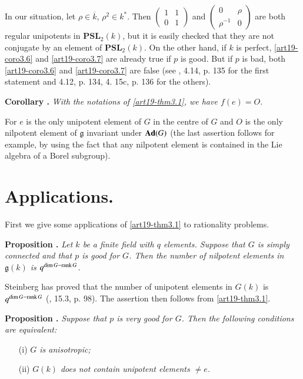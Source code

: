 In our situation, let $\rho\in \overline{k}$, $\rho^{2}\in k^{*}$. Then $\left(\begin{matrix} 1 & 1\\ 0 & 1\end{matrix}\right)$ and $\left(\begin{matrix} 0 & \rho\\ \rho^{-1} & 0\end{matrix}\right)$ are both regular unipotents in $\mathbf{PSL}_{2}(k)$, but it is easily checked that they are not conjugate by an element of $\mathbf{PSL}_{2}(k)$. On the other hand, if $k$ is perfect, \ref{art19-coro3.6} and \ref{art19-coro3.7} are already true if $p$ is good. But if $p$ is bad, both \ref{art19-coro3.6} and \ref{art19-coro3.7} are false (see \cite{art19-key14}, 4.14, p. 135 for the first statement and 4.12, p. 134, 4. 15c, p. 136 for the others).

\medskip
\noindent
{\bf Corollary .\label{art19-coro3.9}}
{\em With the notations of \ref{art19-thm3.1}, we have $f(e)=O$.}
\smallskip

For $e$ is the only unipotent element of $G$ in the centre of $G$ and $O$ is the only nilpotent element of $\mathfrak{g}$ invariant under $\mathbf{Ad}(G)$ (the last assertion follows for example, by using the fact that any nilpotent element is contained in the Lie algebra of a Borel subgroup).

\section{Applications.}\label{art19-sec4}

First we give some applications of \ref{art19-thm3.1} to rationality problems.

\medskip
\noindent
{\bf Proposition .\label{art19-prop4.1}}
{\em Let $k$ be a finite field with $q$ elements. Suppose that $G$ is simply connected and that $p$ is good for $G$. Then the number of nilpotent elements in $\mathfrak{g}(k)$ is $q^{\dim G-\operatorname{\mathrm{rank}} G}$.}
\smallskip

Steinberg has proved that the number of unipotent elements in $G(k)$ is $q^{\dim G-\operatorname{\mathrm{rank}} G}$ (\cite{art19-key16}, 15.3, p. 98). The assertion then follows from \ref{art19-thm3.1}.

\medskip
\noindent
{\bf Proposition .\label{art19-prop4.2}}
{\em Suppose that $p$ is very good for $G$. Then the following conditions are equivalent:}
\begin{itemize}
\item[\rm(i)] {\em $G$ is anisotropic;}

\item[\rm(ii)] {\em $G(k)$ does not contain unipotent elements $\neq e$.}
\end{itemize}

